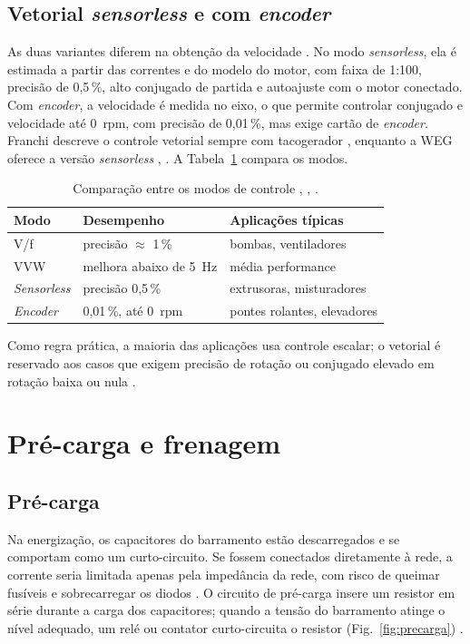 \documentclass[conference]{IEEEtran}
\begin{document}
\subsection{Vetorial \textit{sensorless} e com \textit{encoder}}

As duas variantes diferem na obtenção da velocidade \cite{b3}. No modo \textit{sensorless}, ela é estimada a partir das correntes e do modelo do motor, com faixa de 1:100, precisão de 0,5\,\%, alto conjugado de partida e autoajuste com o motor conectado. Com \textit{encoder}, a velocidade é medida no eixo, o que permite controlar conjugado e velocidade até 0~rpm, com precisão de 0,01\,\%, mas exige cartão de \textit{encoder}. Franchi descreve o controle vetorial sempre com tacogerador \cite{b1}, enquanto a WEG oferece a versão \textit{sensorless} \cite{b3}, \cite{b8}. A Tabela~\ref{tab:controles} compara os modos.

\begin{table}[H]
\centering
\caption{Comparação entre os modos de controle \cite{b1}, \cite{b3}, \cite{b5}.}
\label{tab:controles}
\begin{tabular}{lll}
\hline
\textbf{Modo} & \textbf{Desempenho} & \textbf{Aplicações típicas} \\
\hline
V/f & precisão $\approx$ 1\,\% & bombas, ventiladores \\
VVW & melhora abaixo de 5~Hz & média performance \\
\textit{Sensorless} & precisão 0,5\,\% & extrusoras, misturadores \\
\textit{Encoder} & 0,01\,\%, até 0~rpm & pontes rolantes, elevadores \\
\hline
\end{tabular}
\end{table}

Como regra prática, a maioria das aplicações usa controle escalar; o vetorial é reservado aos casos que exigem precisão de rotação ou conjugado elevado em rotação baixa ou nula \cite{b1}.

\section{Pré-carga e frenagem}

\subsection{Pré-carga}
\label{sec:precarga}

Na energização, os capacitores do barramento estão descarregados e se comportam como um curto-circuito. Se fossem conectados diretamente à rede, a corrente seria limitada apenas pela impedância da rede, com risco de queimar fusíveis e sobrecarregar os diodos \cite{b13}. O circuito de pré-carga insere um resistor em série durante a carga dos capacitores; quando a tensão do barramento atinge o nível adequado, um relé ou contator curto-circuita o resistor (Fig.~\ref{fig:precarga}) \cite{b13}.
\end{document}
